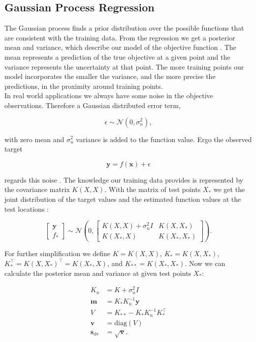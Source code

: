 \subsection{Gaussian Process Regression}
The Gaussian process finds a prior distribution over the possible functions that are consistent with the training data. From the regression we get a posterior mean and variance, which describe our model of the objective function \cite{rasmussen2006gaussian}. The mean represents a prediction of the true objective at a given point and the variance represents the uncertainty at that point. The more training points our model incorporates the smaller the variance, and the more precise the predictions, in the proximity around training points.\\
In real world applications we always have some noise in the objective observations. Therefore a Gaussian distributed error term,

$$\epsilon \sim \mathcal{N}(0,\sigma_n^2),$$

with zero mean and $\sigma_n^2$ variance is added to the function value. Ergo the observed target

$$\mathbf{y} = f(\mathbf{x}) + \epsilon$$

regards this noise \cite{brochu2010tutorial,shahriari2016taking,lizotte2008practical,rasmussen2006gaussian}. The knowledge our training data provides is represented by the covariance matrix $K(X,X)$. With the matrix of test points $X_*$ we get the joint distribution of the target values and the estimated function values at the test locations \cite{rasmussen2006gaussian}:

$$\left[ \begin{array}{c} \mathbf{y} \\ f_* \end{array} \right] \sim \mathcal{N} \left(0, \begin{bmatrix} K(X,X)+\sigma_n^2 I & K(X,X_*) \\ K(X_*,X) & K(X_*,X_*) \end{bmatrix} \right).$$

For further simplification we define $K = K(X,X)$, $K_* = K(X,X_*)$, $K_*^{\top} = K(X,X_*)^{\top} = K(X_*,X)$, and $K_{**} = K(X_*,X_*)$. Now we can calculate the posterior mean and variance at given test points $X_*$:

\begin{align}
    K_n &= K+\sigma_n^2 I \label{eq:kNoise} \\
    \mathbf{m} &= K_*K_n^{-1}\mathbf{y} \label{eq:meanGauss} \\
    V &= K_{**}-K_*K_n^{-1}K_*^\top \label{eq:wholeVar} \\
    \mathbf{v} &= \mathrm{diag}(V) \label{eq:vectorVar} \\
    \mathbf{s}_\mathrm{dv} &= \sqrt{\mathbf{v}}. \label{eq:gp:stdv}\\ \nonumber
\end{align}


